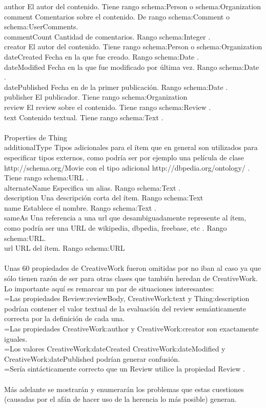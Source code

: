 author 	El autor del contenido. Tiene rango schema:Person o schema:Organization\\
comment 	Comentarios sobre el contenido. De rango schema:Comment o schema:UserComments.\\
commentCount 	Cantidad de comentarios. Rango schema:Integer . \\
creator 	El autor del contenido. Tiene rango schema:Person o schema:Organization\\
dateCreated 	Fecha en la que fue creado. Rango schema:Date .\\
dateModified 	Fecha en la que fue modificado por última vez. Rango schema:Date .\\
datePublished 	Fecha en de la primer publicación. Rango schema:Date .\\
publisher 	El publicador. Tiene rango schema:Organization\\
review 	 	El review sobre el contenido. Tiene rango schema:Review .\\
text 		Contenido textual. Tiene rango schema:Text .\\
\\Properties de Thing\\
additionalType 	 Tipos adicionales para el ítem que en general son utilizados para especificar tipos externos, como podría ser por ejemplo una película de clase http://schema.org/Movie con el tipo adicional  http://dbpedia.org/ontology/ . Tiene rango schema:URL .\\
alternateName 	 Especifica un alias. Rango schema:Text .\\
description 	Una descripción corta del ítem. Rango schema:Text \\
name 		Establece el nombre. Rango schema:Text .\\
sameAs 		Una referencia a una url que desambiguadamente represente al ítem, como podría ser una URL de wikipedia, dbpedia, freebase, etc . Rango schema:URL.\\
url 		URL del ítem. Rango schema:URL\\
\\
Unas 60 propiedades de CreativeWork fueron omitidas por no iban al caso ya que sólo tienen razón de ser para otras clases que 
también heredan de CreativeWork. Lo importante aquí es remarcar un par de situaciones interesantes:\\
=Las propiedades Review:reviewBody, CreativeWork:text y Thing:description podrían contener el valor textual de la evaluación del review semánticamente correcta por la definición de cada una.\\
=Las propiedades CreativeWork:author y CreativeWork:creator son exactamente iguales. \\
=Los valores CreativeWork:dateCreated CreativeWork:dateModified y CreativeWork:datePublished podrían generar confusión. \\
=Sería sintácticamente correcto que un Review utilice la propiedad Review .\\
\\
Más adelante se mostrarán y enumerarán los problemas que estas cuestiones (causadas por el afán de hacer uso de la herencia
lo más posible)  generan. \\